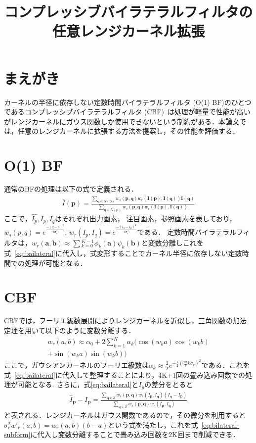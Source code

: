 \documentclass[twocolumn, a4paper]{./ieicejsp_tokai}
\title{{コンプレッシブバイラテラルフィルタの任意レンジカーネル拡張}
}
\author{
  }
\begin{document}
\maketitle

\section{まえがき}
カーネルの半径に依存しない定数時間バイラテラルフィルタ (O(1) BF)のひとつであるコンプレッシブバイラテラルフィルタ (CBF)~\cite{compressiveBF}は処理が軽量で性能が高いがレンジカーネルにガウス関数しか使用できないという制約がある．本論文では，任意のレンジカーネルに拡張する方法を提案し，その性能を評価する．
%
\section{O(1) BF}
通常のBFの処理は以下の式で定義される．
\begin{align}
\bar{I}(\bm{p}) =\frac{\sum_{\bm{q}\in N(\bm{p})}w_{s}(\bm{p},\bm{q})w_{r}(\bm{I}(\bm{p}),\bm{I}(\bm{q}))\bm{I}(\bm{q})}{\sum_{\bm{q}\in N(\bm{p})}w_{s}(\bm{p},\bm{q})w_{r}(\bm{I}(\bm{p}),\bm{I}(\bm{q}))}
\label{eq:bailateral}
\end{align}
ここで，$\hat{I_p}, I_p, I_q$はそれぞれ出力画素， 注目画素，参照画素を表しており，$w_{s}(p,q)=e^{\frac{-(q-p)^{2}}{2\sigma_{s}^{2}}}$, $w_{r}(I_p,I_q)=e^{\frac{-(I_q-I_p)^{2}}{2\sigma_{r}^{2}}}$である．
定数時間バイラテラルフィルタは，$w_{r}(\bm{a},\bm{b})\approx\sum{_{k=0}^{K-1}}\phi_{k}(\bm{a})\psi_{k}(\bm{b})$と変数分離しこれを式~\eqref{eq:bailateral}に代入し，式変形することでカーネル半径に依存しない定数時間での処理が可能となる．
%
\section{CBF}
CBFでは，フーリエ級数展開によりレンジカーネルを近似し，三角関数の加法定理を用いて以下のように変数分離する．
\begin{align}
  w_r(a,b) \approx \alpha_{0} + 2\sum_{k=1}^{K}\alpha_{k}(\cos(w_{k}a)\cos(w_{k}b) \nonumber\\
  +\sin(w_{k}a)\sin(w_{k}b))
  \label{eq:cosdecomposition}
\end{align}
ここで，ガウシアンカーネルのフーリエ級数は$\alpha_{k} \approx \frac{2}{T}e^{-\frac{1}{2}(\frac{2\pi}{T}k\sigma_{r})^{2}}$である．これを式~\eqref{eq:bailateral}に代入して整理することにより，4K+1回の畳み込み回数での処理が可能となる.
さらに，式\eqref{eq:bailateral}と$I_{p}$の差分をとると
\begin{align}
 \hat{I}_{\bm{p}}\!-\!I_{\bm{p}} = \frac{\sum_{\bm{q}\in\mathcal{S}} w_s(\bm{p},\bm{q})w_r(I_{\bm{p}},I_{\bm{q}})(I_{\bm{q}} - I_{\bm{p}})
}{\sum_{\bm{q}\in\mathcal{S}} w_s(\bm{p},\bm{q})w_r(I_{\bm{p}},I_{\bm{q}})}
\label{eq:bilateral-subform}
\end{align}
と表される．レンジカーネルはガウス関数であるので，その微分を利用すると$\sigma_{r}^{2}w'_{r}(a,b) = w_{r}(a,b)(b-a)$という式を満たし，これを式~\eqref{eq:bilateral-subform}に代入し変数分離することで畳み込み回数を2K回まで削減できる．
%
\end{document}
